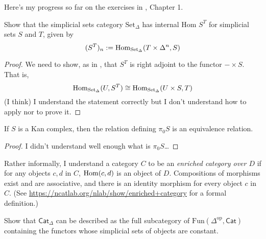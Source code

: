 Here's my progress so far on the exercises in \cite{Rune}, Chapter 1.

\begin{exercise}[Observation 1.4.7]
\label{exercise-simplicial-sets-category-has-internal-Hom}
Show that the simplicial sets category  $\text{Set}_\Delta$ has internal 
Hom $S^T$ for simplicial sets $S$ and $T$, given by
$$
(S^T)_n:=\mathop{\mathrm{Hom}}\nolimits_{\text{Set}_\Delta}(T\times\Delta^n,S)
$$
\end{exercise}

\begin{proof}
We need to show, as in \cite[Notation 1.1.13]{Cisinsky},
that $S^T$ is right adjoint to 
the functor $- \times S$.
That is,
$$
\mathop{\mathrm{Hom}}\nolimits_{\text{Set}_\Delta}(U,S^T)\cong \mathop{\mathrm{Hom}}\nolimits_{\text{Set}_\Delta}(U \times S,T)
$$
(I think) I understand the statement correctly
but I don't understand how to apply
\cite[Theorem 1.1.10 (Kan)]{Cisinsky} nor \cite[Remark 1.1.11]{Cisinsky}
to prove it.
\end{proof}

\begin{exercise}[1.1]
\label{exercise-relation-is-equivalence-relation}
If $S$ is a Kan complex, then the relation defining
$\pi_0S$ is an equivalence relation.
\end{exercise}

\begin{proof}
I didn't understand well enough what is $\pi_0S$…
\end{proof}

Rather informally, I understand a category $C$ to be
an {\it enriched category over $D$} if for any objects
$c,d$ in $C$, $\mathop{\mathrm{Hom}}\nolimits(c,d)$ is an object of $D$.
Compositions of morphisms exist and are associative,
and there is an identity morphism for every object $c$ in $C$.
(See \url{https://ncatlab.org/nlab/show/enriched+category} 
for a formal definition.)

\begin{exercise}[1.2]
\label{exercise-enriched-simplicial-set-categories-are-subcategory-of-Fun}
Show that $\mathsf{Cat}_\Delta$ can be described as the full
subcategory of $\text{Fun}(\Delta^{\text{op}},\mathsf{Cat})$
containing the functors whose simplicial sets of objects
are constant.
\end{exercise}

